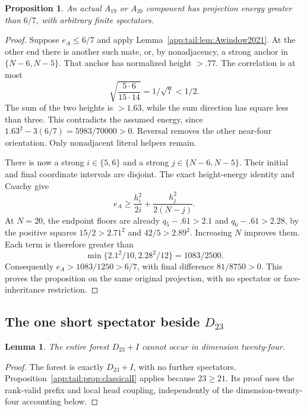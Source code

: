 \documentclass[11pt]{article}
\newtheorem{proposition}[theorem]{Proposition}
\newtheorem{lemma}[theorem]{Lemma}
\theoremstyle{definition}
\theoremstyle{remark}
\begin{document}
\begin{proposition}
\label{app:tail:prop:A19A20}
An actual $A_{19}$ or $A_{20}$ component has projection energy
greater than $6/7$, with arbitrary finite spectators.
\end{proposition}
\begin{proof}
Suppose $e_A\le6/7$ and apply
Lemma~\ref{app:tail:lem:Awindow2021}. At the other end there is another such
mate, or, by nonadjacency, a strong anchor in $\{N-6,N-5\}$.
That anchor has normalized height $>.77$. The correlation is at most
\[
 \sqrt{{\frac{5\cdot6}{15\cdot14}}}=1/\sqrt7<1/2.
\]
The sum of the two heights is $>1.63$, while the sum direction
has square less than three. This contradicts the assumed energy,
since $1.63^2-3(6/7)=5983/70000>0$. Reversal removes the other
near-four orientation. Only nonadjacent literal helpers remain.

There is now a strong $i\in\{5,6\}$ and a strong
$j\in\{N-6,N-5\}$. Their initial and final coordinate intervals
are disjoint. The exact height-energy identity and Cauchy give
\[
 e_A\ge{\frac{h_i^2}{2i}}+{\frac{h_j^2}{2(N-j)}}.
\]
At $N=20$, the endpoint floors are already $q_5-.61>2.1$ and
$q_6-.61>2.28$, by the positive squares
$15/2>2.71^2$ and $42/5>2.89^2$. Increasing $N$ improves them.
Each term is therefore greater than
\[
 \min\{2.1^2/10,2.28^2/12\}=1083/2500.
\]
Consequently $e_A>1083/1250>6/7$, with final difference
$81/8750>0$. This proves the proposition on the same original
projection, with no spectator or face-inheritance restriction.
\end{proof}

\subsection[The one short spectator beside D23]{The one short spectator beside $D_{23}$}
\label{app:tail:D23I}
\begin{lemma}
\label{app:tail:lem:D23I}
The entire forest $D_{23}+I$ cannot occur in dimension twenty-four.
\end{lemma}
\begin{proof}
The forest is exactly $D_{23}+I$, with no further spectators.
Proposition~\ref{app:tail:prop:classicalI} applies because $23\ge21$.
Its proof uses the rank-valid prefix and local head coupling,
independently of the dimension-twenty-four accounting below.
\end{proof}
\end{document}

